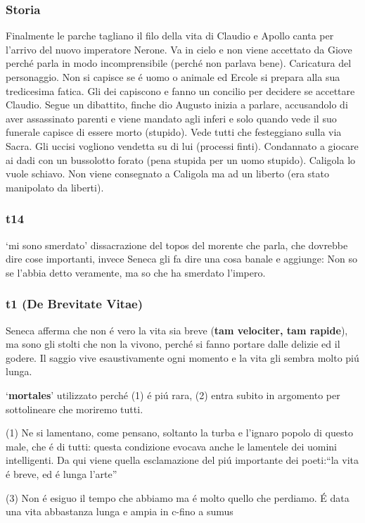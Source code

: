 \documentclass{article}
\begin{document}
\subsubsection{Storia}
Finalmente le parche tagliano il filo della vita di Claudio e Apollo canta per l'arrivo del nuovo imperatore Nerone. Va in cielo e non viene accettato da Giove perché parla in modo incomprensibile (perché non parlava bene). Caricatura del personaggio. Non si capisce se é uomo o animale ed Ercole si prepara alla sua tredicesima fatica. Gli dei capiscono e fanno un concilio per decidere se accettare Claudio. Segue un dibattito, finche dio Augusto inizia a parlare, accusandolo di aver assassinato parenti e viene mandato agli inferi e solo quando vede il suo funerale capisce di essere morto (stupido). Vede tutti che festeggiano sulla via Sacra. Gli uccisi vogliono vendetta su di lui (processi finti). Condannato a giocare ai dadi con un bussolotto forato (pena stupida per un uomo stupido). Caligola lo vuole schiavo. Non viene consegnato a Caligola ma ad un liberto (era stato manipolato da liberti).
\subsubsection{t14}
`mi sono smerdato' dissacrazione del topos del morente che parla, che dovrebbe dire cose importanti, invece Seneca gli fa dire una cosa banale e aggiunge: Non so se l'abbia detto veramente, ma so che ha smerdato l'impero.
\subsubsection{t1 (De Brevitate Vitae)}
Seneca afferma che non é vero la vita sia breve (\textbf{tam velociter, tam rapide}), ma sono gli stolti che non la vivono, perché si fanno portare dalle delizie ed il godere. Il saggio vive esaustivamente ogni momento e la vita gli sembra molto piú lunga. 

`\textbf{mortales}' utilizzato perché (1) é piú rara, (2) entra subito in argomento per sottolineare che moriremo tutti.

(1) Ne si lamentano, come pensano, soltanto la turba e l'ignaro popolo di questo male, che é di tutti: questa condizione evocava anche le lamentele dei uomini intelligenti. Da qui viene quella esclamazione del piú importante dei poeti:``la vita é breve, ed é lunga l'arte''

(3) Non é esiguo il tempo che abbiamo ma é molto quello che perdiamo. É data una vita abbastanza lunga e ampia in c-fino a sumus
\end{document}
